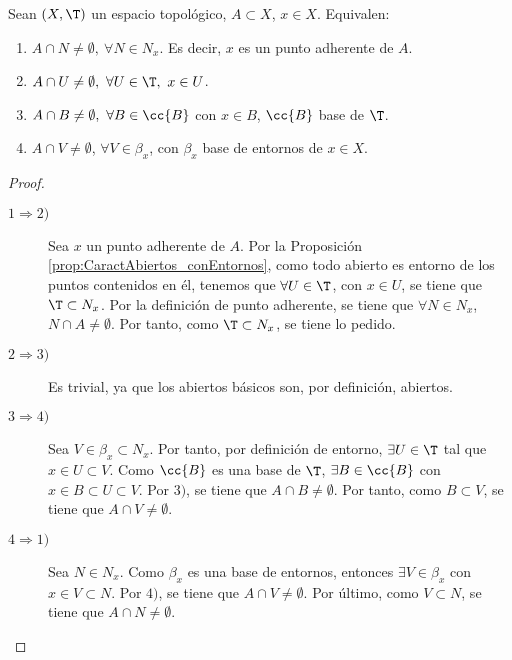 \begin{prop}\label{prop:Caract_PtoAdherente}
    Sean $(X,\T)$ un espacio topológico, $A\subset X$, $x\in X$. Equivalen:
    \begin{enumerate}
        \item $A\cap N\neq \emptyset,~\forall N\in N_x$. Es decir, $x$ es un punto adherente de $A$.
        \item $A\cap U\neq \emptyset,~\forall U\in \T,~x\in U$.
        \item $A\cap B\neq \emptyset,~\forall B\in \cc{B}$ con $x\in B$, $\cc{B}$ base de $\T$.
        \item $A\cap V\neq \emptyset$, $\forall V\in \beta_x$, con $\beta_x$ base de entornos de $x\in X$.
    \end{enumerate}
\end{prop}
\begin{proof}\
    \begin{description}
        \item[$1\Longrightarrow 2)$] Sea $x$ un punto adherente de $A$. Por la Proposición \ref{prop:CaractAbiertos_conEntornos}, como todo abierto es entorno de los puntos contenidos en él, tenemos que $\forall U\in \T$, con $x\in U$, se tiene que $\T \subset N_x$. Por la definición de punto adherente, se tiene que $\forall N\in N_x$, $N\cap A\neq \emptyset$. Por tanto, como $\T \subset N_x$, se tiene lo pedido.

        \item[$2\Longrightarrow 3)$] Es trivial, ya que los abiertos básicos son, por definición, abiertos.
        
        \item[$3\Longrightarrow 4)$] Sea $V\in \beta_x\subset N_x$. Por tanto, por definición de entorno, $\exists U\in \T$ tal que $x\in U\subset V$. Como $\cc{B}$ es una base de $\T$, $\exists B\in \cc{B}$ con $x\in B\subset U\subset V$. Por $3)$, se tiene que $A\cap B\neq \emptyset$. Por tanto, como $B\subset V$, se tiene que $A\cap V\neq \emptyset$.

        \item[$4\Longrightarrow 1)$] Sea $N\in N_x$. Como $\beta_x$ es una base de entornos, entonces $\exists V\in \beta_x$ con $x\in V\subset N$. Por $4)$, se tiene que $A\cap V\neq \emptyset$. Por último, como $V\subset N$, se tiene que $A\cap N\neq \emptyset$.
    \end{description}
\end{proof}

